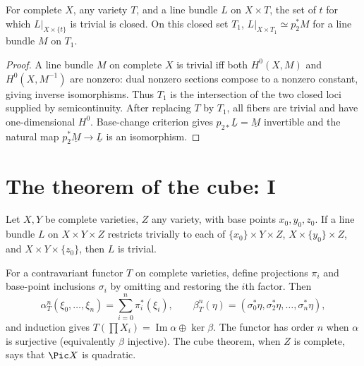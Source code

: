 \begin{theorem}
\label{mumford-thm-seesaw}
For complete $X$, any variety $T$, and a line bundle $L$ on $X\times T$, the
set of $t$ for which $L|_{X\times\{t\}}$ is trivial is closed. On this closed
set $T_1$, $L|_{X\times T_1}\simeq p_2^*M$ for a line bundle $M$ on $T_1$.
\end{theorem}
\begin{proof}
A line bundle $M$ on complete $X$ is trivial iff both $H^0(X,M)$ and
$H^0(X,M^{-1})$ are nonzero: dual nonzero sections compose to a nonzero
constant, giving inverse isomorphisms. Thus $T_1$ is the intersection of the
two closed loci supplied by semicontinuity. After replacing $T$ by $T_1$,
all fibers are trivial and have one-dimensional $H^0$. Base-change criterion
gives $p_{2*}\underline L=\underline M$ invertible and the natural map
$p_2^*\underline M\to\underline L$ is an isomorphism.
\end{proof}

\section{The theorem of the cube: I}
\label{mumford-source-II6}

\begin{theorem}
\label{mumford-thm-cube-varieties}
Let $X,Y$ be complete varieties, $Z$ any variety, with base points
$x_0,y_0,z_0$. If a line bundle $L$ on $X\times Y\times Z$ restricts
trivially to each of $\{x_0\}\times Y\times Z$,
$X\times\{y_0\}\times Z$, and $X\times Y\times\{z_0\}$, then $L$ is trivial.
\end{theorem}

\begin{remark}
\label{mumford-source-functor-order}
For a contravariant functor $T$ on complete varieties, define projections
$\pi_i$ and base-point inclusions $\sigma_i$ by omitting and restoring the
$i$th factor. Then
\[
 \alpha_T^n(\xi_0,\ldots,\xi_n)=\sum_{i=0}^n\pi_i^*(\xi_i),
 \qquad
 \beta_T^n(\eta)=(\sigma_0^*\eta,\sigma_2^*\eta,\ldots,\sigma_n^*\eta),
\]
and induction gives $T(\prod X_i)=\operatorname{Im}\alpha\oplus\ker\beta$.
The functor has order $n$ when $\alpha$ is surjective (equivalently $\beta$
injective). The cube theorem, when $Z$ is complete, says that $\Pic X$ is
quadratic.
\end{remark}
